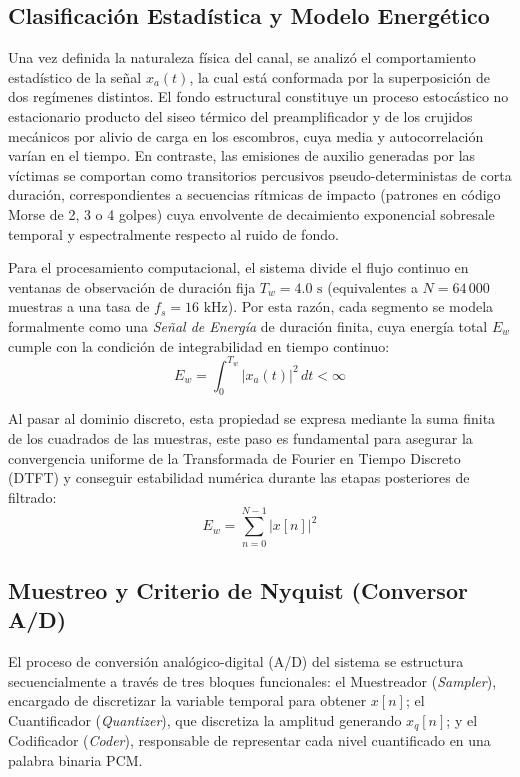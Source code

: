 \documentclass[journal, a4paper]{IEEEtran}
\begin{document}
\subsection{Clasificación Estadística y Modelo Energético}
Una vez definida la naturaleza física del canal, se analizó el comportamiento estadístico de la señal $x_a(t)$, la cual está conformada por la superposición de dos regímenes distintos. El fondo estructural constituye un proceso estocástico no estacionario producto del siseo térmico del preamplificador y de los crujidos mecánicos por alivio de carga en los escombros, cuya media y autocorrelación varían en el tiempo. En contraste, las emisiones de auxilio generadas por las víctimas se comportan como transitorios percusivos pseudo-deterministas de corta duración, correspondientes a secuencias rítmicas de impacto (patrones en código Morse de 2, 3 o 4 golpes) cuya envolvente de decaimiento exponencial sobresale temporal y espectralmente respecto al ruido de fondo.

Para el procesamiento computacional, el sistema divide el flujo continuo en ventanas de observación de duración fija $T_w = 4.0\text{ s}$ (equivalentes a $N = 64\,000$ muestras a una tasa de $f_s = 16\text{ kHz}$). Por esta razón, cada segmento se modela formalmente como una \textit{Señal de Energía} de duración finita, cuya energía total $E_w$ cumple con la condición de integrabilidad en tiempo continuo:
\begin{equation}
    E_w = \int_0^{T_w} |x_a(t)|^2 \, dt < \infty
\end{equation}

Al pasar al dominio discreto, esta propiedad se expresa mediante la suma finita de los cuadrados de las muestras, este paso es fundamental para asegurar la convergencia uniforme de la Transformada de Fourier en Tiempo Discreto (DTFT) y conseguir estabilidad numérica durante las etapas posteriores de filtrado:
\begin{equation}
    E_w = \sum_{n=0}^{N-1} |x[n]|^2
\end{equation}



\subsection{Muestreo y Criterio de Nyquist (Conversor A/D)}
El proceso de conversión analógico-digital (A/D) del sistema se estructura secuencialmente a través de tres bloques funcionales: el Muestreador (\textit{Sampler}), encargado de discretizar la variable temporal para obtener $x[n]$; el Cuantificador (\textit{Quantizer}), que discretiza la amplitud generando $x_q[n]$; y el Codificador (\textit{Coder}), responsable de representar cada nivel cuantificado en una palabra binaria PCM.
\end{document}
